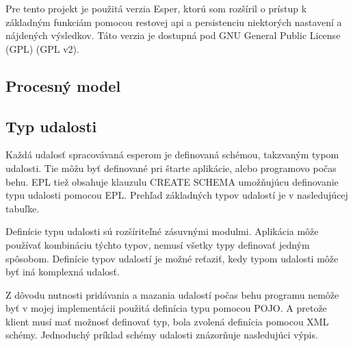 	Pre tento projekt je použitá verzia Esper, ktorú som rozšíril o prístup k základným funkciám pomocou restovej api a persistenciu niektorých nastavení a nájdených výsledkov. Táto verzia je dostupná pod GNU General Public License (GPL) (GPL v2).

	\subsection{Procesný model}

	\subsection{Typ udalosti}
	Každá udalosť spracovávaná esperom je definovaná schémou, takzvaným typom udalosti. Tie môžu byť definované pri štarte aplikácie, alebo programovo počas behu. EPL tiež obsahuje klauzulu CREATE SCHEMA umožňujúcu definovanie typu udalosti pomocou EPL. Prehľad základných typov udalostí je v nasledujúcej tabuľke.

	
	Definície typu udalosti sú rozšíriteľné zásuvnými modulmi. Aplikácia môže používať kombináciu týchto typov, nemusí všetky typy definovať jedným spôsobom. Definície typov udalostí je možné reťaziť, kedy typom udalosti môže byť iná komplexná udalosť.
	
	Z dôvodu nutnosti pridávania a mazania udalostí počas behu programu nemôže byť v mojej implementácii použitá definícia typu pomocou POJO. A pretože klient musí mať možnosť definovať typ, bola zvolená definícia pomocou XML schémy. Jednoduchý príklad schémy udalosti znázorňuje nasledujúci výpis. 
	
